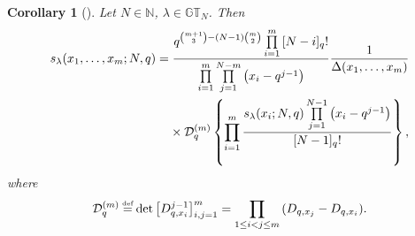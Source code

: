 \documentclass[pdftex]{sigma}
\numberwithin{equation}{section}
\newcommand\myeq{\mathrel{\stackrel{\makebox[0pt]{\mbox{\normalfont\tiny def}}}{=}}}
\newtheorem{cor}[thm]{Corollary}
\newcommand{\N}{\mathbb{N}}
\newcommand{\GT}{\mathbb{GT}}
\newcommand{\DD}{\mathcal{D}}
\begin{document}
\begin{cor}[{\cite[Theorem~3.5]{GP}}]\label{macdonaldcor4}
Let $N\in\N$, $\lambda\in\GT_N$. Then
\begin{gather*}
s_{\lambda}(x_1, \dots, x_m; N, q) = \frac{q^{{m+1 \choose 3} - (N-1){m \choose 2} }\prod\limits_{i=1}^m{[N - i]_q!}}{\prod\limits_{i=1}^m{\prod\limits_{j=1}^{N - m}{\big(x_i - q^{j-1}\big)}}}\frac{1}{\Delta(x_1, \dots, x_m)}\\
\hphantom{s_{\lambda}(x_1, \dots, x_m; N, q) =}{} \times \DD_q^{(m)}\left\{ \prod\limits_{i=1}^m{\frac{s_{\lambda}(x_i; N, q)\prod\limits_{j=1}^{N-1}{\big(x_i - q^{j-1}\big)}}{[N-1]_q!}}\right\},
\end{gather*}
where
\begin{gather*}
\DD_{q}^{(m)} \myeq \det \big[ D_{q, x_i}^{j-1} \big]_{i, j = 1}^m = \prod_{1\leq i < j\leq m}{(D_{q, x_j} - D_{q, x_i})}.
\end{gather*}
\end{cor}
\end{document}
